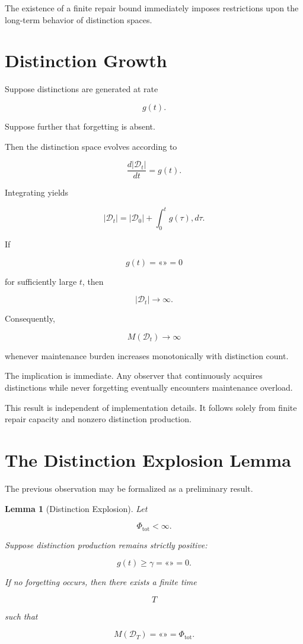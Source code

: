 \documentclass[12pt,oneside]{book}
\theoremstyle{plain} \newtheorem{theorem}{Theorem}[chapter] \newtheorem{lemma}[theorem]{Lemma} \newtheorem{proposition}[theorem]{Proposition} \newtheorem{corollary}[theorem]{Corollary}
\theoremstyle{definition} \newtheorem{definition}[theorem]{Definition} \newtheorem{axiom}[theorem]{Axiom} \newtheorem{construction}[theorem]{Construction}
\theoremstyle{remark} \newtheorem{remark}[theorem]{Remark} \newtheorem{example}[theorem]{Example}
\newcommand{\D}{\mathcal{D}} \newcommand{\R}{\mathcal{R}} \newcommand{\F}{\mathcal{F}} \newcommand{\U}{\mathcal{U}} \newcommand{\M}{\mathcal{M}} \newcommand{\G}{\Gamma}
\begin{document}
The existence of a finite repair bound immediately imposes restrictions upon the long-term behavior of distinction spaces.

\section{Distinction Growth}

Suppose distinctions are generated at rate

\[
g(t).
\]

Suppose further that forgetting is absent.

Then the distinction space evolves according to

\[
\frac{d|\D_t|}{dt}
=
g(t).
\]

Integrating yields

\[
|\D_t|
=
|\D_0|
+
\int_0^t
g(\tau),d\tau.
\]

If

\[
g(t)
=
«»
=
0
\]

for sufficiently large $t$, then

\[
|\D_t|
\rightarrow
\infty.
\]

Consequently,

\[
M(\D_t)
\rightarrow
\infty
\]

whenever maintenance burden increases monotonically with distinction count.

The implication is immediate. Any observer that continuously acquires distinctions while never forgetting eventually encounters maintenance overload.

This result is independent of implementation details. It follows solely from finite repair capacity and nonzero distinction production.

\section{The Distinction Explosion Lemma}

The previous observation may be formalized as a preliminary result.

\begin{lemma}[Distinction Explosion]

Let

\[
\Phi_{\mathrm{tot}}
<
\infty.
\]

Suppose distinction production remains strictly positive:

\[
g(t)
\geq
\gamma
=
«»
=
0. 

\]

If no forgetting occurs, then there exists a finite time

\[
T
\]

such that

\[
M(\D_T)
=
«»
=
\Phi_{\mathrm{tot}}.
\]

\end{lemma}
\end{document}
